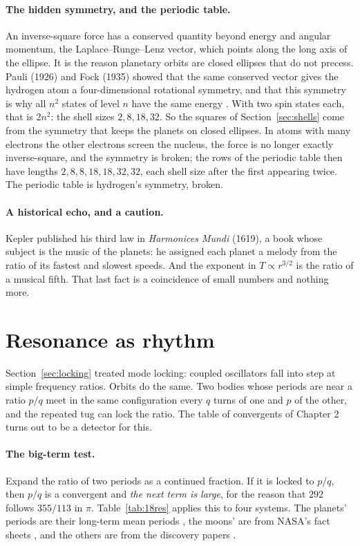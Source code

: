 \paragraph{The hidden symmetry, and the periodic table.} An inverse-square force has a conserved quantity
beyond energy and angular momentum, the Laplace--Runge--Lenz vector, which points along the long axis of
the ellipse. It is the reason planetary orbits are closed ellipses that do not precess. Pauli (1926) and
Fock (1935) showed that the same conserved vector gives the hydrogen atom a four-dimensional rotational
symmetry, and that this symmetry is why all $n^{2}$ states of level $n$ have the same energy
\cite{pauli1926,fock1935}. With two spin states each, that is $2n^{2}$: the shell sizes $2,8,18,32$. So
the squares of Section~\ref{sec:shells} come from the symmetry that keeps the planets on closed ellipses. In atoms
with many electrons the other electrons screen the nucleus, the force is no longer exactly inverse-square,
and the symmetry is broken; the rows of the periodic table then have lengths $2,8,8,18,18,32,32$, each
shell size after the first appearing twice. The periodic table is hydrogen's symmetry, broken.

\paragraph{A historical echo, and a caution.} Kepler published his third law in \emph{Harmonices Mundi}
(1619), a book whose subject is the music of the planets: he assigned each planet a melody from the ratio
of its fastest and slowest speeds. And the exponent in $T\propto r^{3/2}$ is the ratio of a musical
fifth. That last fact is a coincidence of small numbers and nothing more.

\section{Resonance as rhythm}\label{sec:18resonance}

Section~\ref{sec:locking} treated mode locking: coupled oscillators fall into step at simple frequency ratios. Orbits do
the same. Two bodies whose periods are near a ratio $p/q$ meet in the same configuration every $q$ turns
of one and $p$ of the other, and the repeated tug can lock the ratio. The table of convergents of Chapter
2 turns out to be a detector for this.

\paragraph{The big-term test.} Expand the ratio of two periods as a continued fraction. If it is locked
to $p/q$, then $p/q$ is a convergent and \emph{the next term is large}, for the reason that $292$ follows
$355/113$ in $\pi$. Table~\ref{tab:18res} applies this to four systems. The planets' periods are their long-term mean
periods \cite{standish1992}, the moons' are from NASA's fact sheets \cite{nasafact}, and the others are
from the discovery papers \cite{agol2021,luque2023}.

